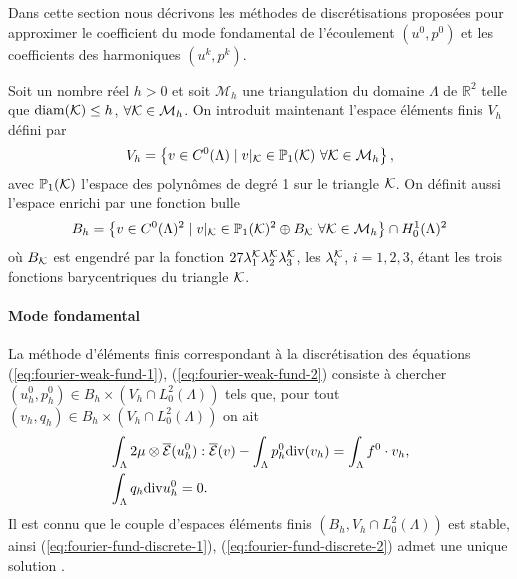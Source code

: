 Dans cette section nous décrivons les méthodes de discrétisations
proposées pour approximer le coefficient du mode fondamental de
l'écoulement $(u^0, p^0)$ et les coefficients des harmoniques $(u^k,
p^k)$.

Soit un nombre réel $h > 0$ et soit $\mathcal M_h$ une triangulation
du domaine $\Lambda$ de $\mathbb R^2$ telle que $\operatorname{diam}({\mathcal K})\leq h$,
$\forall {\mathcal K}\in \mathcal M_h$. On introduit maintenant l'espace
éléments finis $V_h$ défini par
\begin{equation}
  V_h = \left\{ v\in C^0(\Lambda)\mid v|_{\mathcal K} \in \mathbb
    P_1({\mathcal K})\ \forall {\mathcal K}\in\mathcal M_h \right\},
\end{equation}
avec $\mathbb P_1({\mathcal K})$ l'espace des polynômes de degré 1 sur le
triangle ${\mathcal K}$. On définit aussi l'espace enrichi par une fonction bulle
\begin{equation}
  B_h = \left\{ v \in C^0(\Lambda)^2 \mid v|_{\mathcal K} \in \mathbb P_1({\mathcal K})^2\oplus
    B_{\mathcal K}\ \forall {\mathcal K}\in\mathcal M_h \right\} \cap H_0^1(\Lambda)^2
\end{equation}
où $B_{\mathcal K}$ est engendré par la fonction $27 \lambda_1^{\mathcal K}
\lambda_2^{\mathcal K}\lambda_3^{\mathcal K}$, les $\lambda_i^{\mathcal K}$, $i = 1,2,3$, étant les
trois fonctions barycentriques du triangle ${\mathcal K}$.

\paragraph{Mode fondamental}
La méthode d'éléments finis correspondant à la discrétisation des équations
(\ref{eq:fourier-weak-fund-1}), (\ref{eq:fourier-weak-fund-2})
consiste à chercher $(u^0_h, p^0_h)\in B_h\times(V_h \cap
L^2_0(\Lambda))$ tels que, pour tout $(v_h, q_h)\in
B_h\times(V_h \cap L^2_0(\Lambda))$ on ait
\begin{align}
  &\int_\Lambda
  2\mu\otimes\overline{\mathcal E}(u^0_h):\overline{\mathcal E}(v)
  -\int_\Lambda p^0_h\mathrm{div}(v_h) = \int_\Lambda f^0\cdot v_h, \label{eq:fourier-fund-discrete-1}\\
  & \int_\Lambda q_h\mathrm{div} u^0_h = 0.\label{eq:fourier-fund-discrete-2}
\end{align}
Il est connu que le couple d'espaces éléments finis $(B_h, V_h \cap
L^2_0(\Lambda))$ est stable, ainsi (\ref{eq:fourier-fund-discrete-1}),
(\ref{eq:fourier-fund-discrete-2}) admet une unique solution \cite{Temam1977}.

